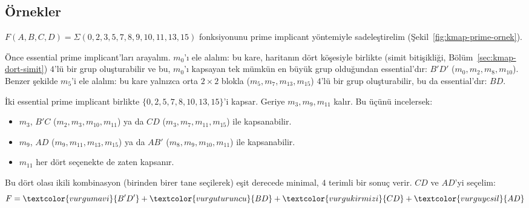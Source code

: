 \subsection{Örnekler}\label{sec:prime-implicant-ornek}
\begin{ornek}\label{orn:kmap-prime}
$F(A,B,C,D)=\Sigma(0,2,3,5,7,8,9,10,11,13,15)$ fonksiyonunu prime implicant yöntemiyle
sadeleştirelim (Şekil~\ref{fig:kmap-prime-ornek}).

Önce essential prime implicant'ları arayalım. $m_0$'ı ele alalım: bu kare, haritanın dört
köşesiyle birlikte (simit bitişikliği, Bölüm~\ref{sec:kmap-dort-simit}) $4$'lü bir grup
oluşturabilir ve bu, $m_0$'ı kapsayan tek mümkün en büyük grup olduğundan essential'dır:
$B'D'$ ($m_0,m_2,m_8,m_{10}$). Benzer şekilde $m_5$'i ele alalım: bu kare yalnızca orta
$2\times2$ blokla ($m_5,m_7,m_{13},m_{15}$) $4$'lü bir grup oluşturabilir, bu da
essential'dır: $BD$.

İki essential prime implicant birlikte $\{0,2,5,7,8,10,13,15\}$'i kapsar. Geriye
$m_3,m_9,m_{11}$ kalır. Bu üçünü incelersek:
\begin{itemize}[nosep, leftmargin=*]
    \item $m_3$, $B'C$ ($m_2,m_3,m_{10},m_{11}$) ya da $CD$ ($m_3,m_7,m_{11},m_{15}$)
    ile kapsanabilir.
    \item $m_9$, $AD$ ($m_9,m_{11},m_{13},m_{15}$) ya da $AB'$
    ($m_8,m_9,m_{10},m_{11}$) ile kapsanabilir.
    \item $m_{11}$ her dört seçenekte de zaten kapsanır.
\end{itemize}
Bu dört olası ikili kombinasyon (birinden birer tane seçilerek) eşit derecede minimal,
$4$ terimli bir sonuç verir. $CD$ ve $AD$'yi seçelim:
\[
F = \textcolor{vurgumavi}{B'D'} + \textcolor{vurguturuncu}{BD} + \textcolor{vurgukirmizi}{CD} + \textcolor{vurguyesil}{AD}
\]


\end{ornek}
